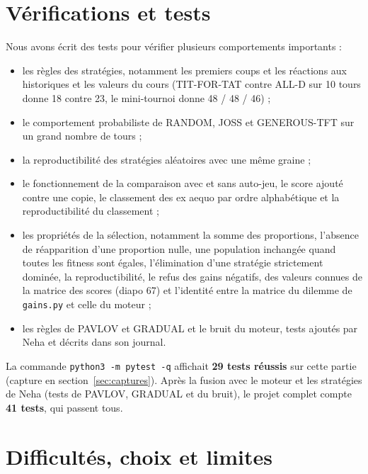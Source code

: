 \documentclass[10pt,a4paper]{article}
\begin{document}
\section{Vérifications et tests}
Nous avons écrit des tests pour vérifier plusieurs comportements importants :
\begin{itemize}
  \item les règles des stratégies, notamment les premiers coups et les réactions aux historiques et les valeurs du cours
  (TIT-FOR-TAT contre ALL-D sur 10 tours donne 18 contre 23, le mini-tournoi donne 48 / 48 / 46) ;
  \item le comportement probabiliste de RANDOM, JOSS et GENEROUS-TFT sur un grand nombre de tours ;
  \item la reproductibilité des stratégies aléatoires avec une même graine ;
  \item le fonctionnement de la comparaison avec et sans auto-jeu, le score ajouté contre une copie, le classement des ex aequo
  par ordre alphabétique et la reproductibilité du classement ;
  \item les propriétés de la sélection, notamment la somme des proportions, l'absence de réapparition d'une proportion nulle,
  une population inchangée quand toutes les fitness sont égales, l'élimination d'une stratégie strictement dominée, la
  reproductibilité, le refus des gains négatifs, des valeurs connues de la matrice des scores (diapo 67) et l'identité entre la
  matrice du dilemme de \texttt{gains.py} et celle du moteur ;
  \item les règles de PAVLOV et GRADUAL et le bruit du moteur, tests ajoutés par Neha et décrits dans son journal.
\end{itemize}
La commande \texttt{python3 -m pytest -q} affichait \textbf{29 tests réussis} sur cette partie (capture en
section~\ref{sec:captures}). Après la fusion avec le moteur et les stratégies de Neha (tests de PAVLOV, GRADUAL et du bruit), le
projet complet compte \textbf{41 tests}, qui passent tous.

\section{Difficultés, choix et limites}
\end{document}
